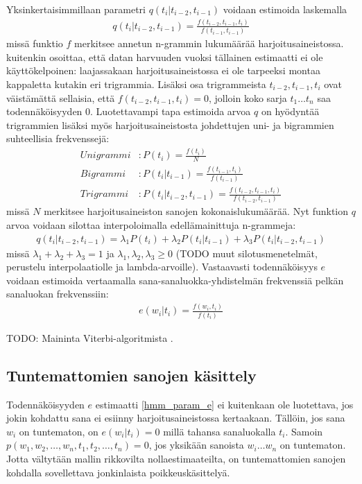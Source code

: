 \documentclass[utf8,bachelor,manualbib]{gradu3}
\begin{document}
Yksinkertaisimmillaan parametri $q(t_i|t_{i-2},t_{i-1})$ voidaan estimoida laskemalla
\begin{align}
q(t_i|t_{i-2},t_{i-1}) = \frac{f(t_{i-2},t_{i-1},t_i)}{f(t_{i-1},t_{i-1})}
\end{align}
missä funktio $f$ merkitsee annetun n-grammin lukumäärää harjoitusaineistossa. \citet{brants2000} kuitenkin osoittaa, että datan harvuuden vuoksi tällainen estimaatti ei ole käyttökelpoinen: laajassakaan harjoitusaineistossa ei ole tarpeeksi montaa kappaletta kutakin eri trigrammia. Lisäksi osa trigrammeista $t_{i-2},t_{i-1},t_i$ ovat väistämättä sellaisia, että $f(t_{i-2},t_{i-1},t_i) = 0$, jolloin koko sarja $t_1 \ldots t_n$ saa todennäköisyyden $0$. Luotettavampi tapa estimoida arvoa $q$ on hyödyntää trigrammien lisäksi myös harjoitusaineistosta johdettujen uni- ja bigrammien suhteellisia frekvenssejä:
\begin{align}
Unigrammi&: P(t_i) = \frac{f(t_i)}{N} \\
Bigrammi&: P(t_i | t_{i-1}) = \frac{f(t_{i-1}, t_i)}{f(t_{i-1})} \\
Trigrammi&: P(t_i | t_{i-2}, t_{i-1}) = \frac{f(t_{i-2},t_{i-1},t_i)}{f(t_{i-2},t_{i-1})}
\end{align}
missä $N$ merkitsee harjoitusaineiston sanojen kokonaislukumäärää. Nyt funktion $q$ arvoa voidaan silottaa interpoloimalla edellämainittuja n-grammeja:
\begin{align}
q(t_i | t_{i-2}, t_{i-1}) = \lambda_1 P(t_i) + \lambda_2 P(t_i | t_{i-1}) + \lambda_3 P(t_i | t_{i-2}, t_{i-1})
\end{align}
missä $\lambda_1+\lambda_2+\lambda_3 = 1$ ja $\lambda_1,\lambda_2,\lambda_3 \geq 0$ (TODO muut silotusmenetelmät, perustelu interpolaatiolle ja lambda-arvoille). Vastaavasti todennäköisyys $e$ voidaan estimoida vertaamalla sana-sanaluokka-yhdistelmän frekvenssiä pelkän sanaluokan frekvenssiin:
\begin{align}
e(w_i|t_i) = \frac{f(w_i, t_i)}{f(t_i)}
\label{hmm_param_e}
\end{align}

TODO: Maininta Viterbi-algoritmista \citep{viterbi1967}.

\subsection{Tuntemattomien sanojen käsittely}

Todennäköisyyden $e$ estimaatti \eqref{hmm_param_e} ei kuitenkaan ole luotettava, jos jokin kohdattu sana ei esiinny harjoitusaineistossa kertaakaan. Tällöin, jos sana $w_i$ on tuntematon, on $e(w_i|t_i)=0$ millä tahansa sanaluokalla $t_i$. Samoin $p(w_1, w_2, \ldots, w_n, t_1, t_2, \ldots, t_n) = 0$, jos yksikään sanoista $w_i \ldots w_n$ on tuntematon. Jotta vältytään mallin rikkovilta nollaestimaateilta, on tuntemattomien sanojen kohdalla sovellettava jonkinlaista poikkeuskäsittelyä.
\end{document}
